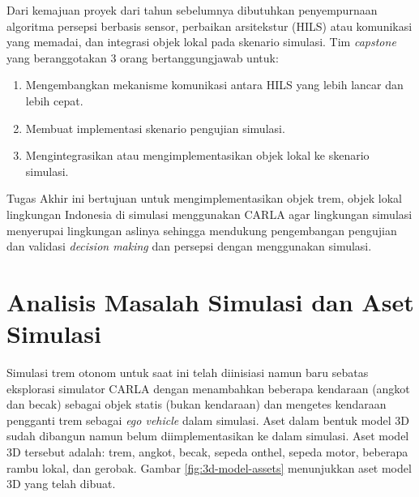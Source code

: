 Dari kemajuan proyek dari tahun sebelumnya dibutuhkan  penyempurnaan algoritma
persepsi berbasis sensor, perbaikan arsitekstur (HILS) atau komunikasi yang
memadai, dan integrasi objek lokal pada skenario simulasi. Tim \textit{capstone}
yang beranggotakan 3 orang bertanggungjawab untuk:

\begin{enumerate}

	\item Mengembangkan mekanisme komunikasi antara HILS yang lebih lancar dan
	lebih cepat.
	\item Membuat implementasi skenario pengujian simulasi.
	\item Mengintegrasikan atau mengimplementasikan objek lokal ke skenario
	simulasi.

\end{enumerate}

Tugas Akhir ini bertujuan untuk mengimplementasikan objek trem, objek lokal
lingkungan Indonesia di simulasi menggunakan CARLA agar lingkungan simulasi
menyerupai lingkungan aslinya sehingga mendukung pengembangan pengujian dan
validasi \textit{decision making} dan persepsi dengan menggunakan simulasi.

\section{Analisis Masalah Simulasi dan Aset Simulasi}

Simulasi trem otonom untuk saat ini telah diinisiasi namun baru sebatas
eksplorasi simulator CARLA dengan menambahkan beberapa kendaraan (angkot dan
becak) sebagai objek statis (bukan kendaraan) dan mengetes kendaraan pengganti
trem sebagai \textit{ego vehicle} dalam simulasi. Aset dalam bentuk model 3D
sudah dibangun namun belum diimplementasikan ke dalam simulasi. Aset model 3D
tersebut adalah: trem, angkot, becak, sepeda onthel, sepeda motor, beberapa
rambu lokal, dan gerobak. Gambar \ref{fig:3d-model-assets} menunjukkan aset
model 3D yang telah dibuat.

